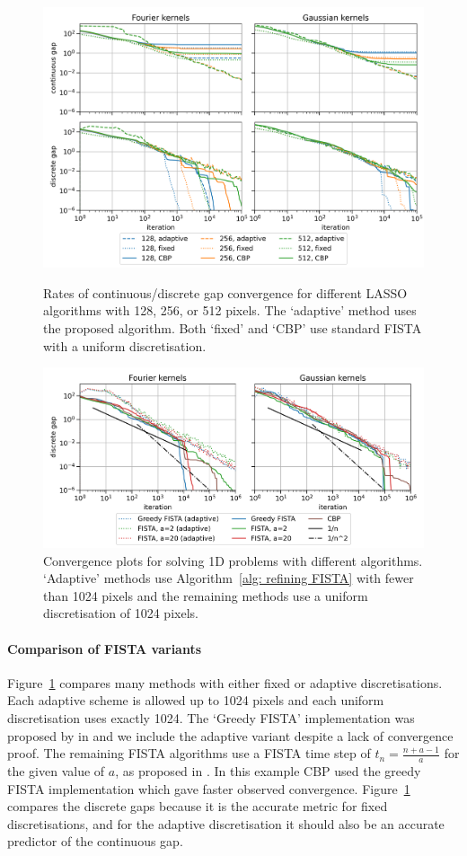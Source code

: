 \documentclass[smallextended]{svjour3}
\newcommand{\1}{\F{1}}
\newcommand{\edit}[2]{{\ifmmode\text{\color{red}\sout{\ensuremath{#1}}}\else {\color{red} \sout{#1}}\fi} {\color{darkgreen} #2}}
\begin{document}
	\begin{figure}\centering
		\includegraphics[width=.84\textwidth]{lasso_ndofs_convergence}
		\caption{Rates of continuous/discrete gap convergence for different LASSO algorithms with 128, 256, or 512 pixels. The `adaptive' method uses the proposed algorithm. Both `fixed' and `CBP' use standard FISTA with a uniform discretisation.}\label{fig: convergence with ndofs}
		
		\vspace*{\floatsep}
		
		\includegraphics[width=.84\textwidth]{lasso_convergence_short}
		\caption{\edit{Discrete }{}Convergence plots for solving 1D problems with different algorithms. `Adaptive' methods use Algorithm~\ref{alg: refining FISTA} with fewer than 1024 pixels and the remaining methods use a uniform discretisation of 1024 pixels.}\label{fig: convergence with method}
	\end{figure}
	
	
	\paragraph{Comparison of FISTA variants}
	Figure~\ref{fig: convergence with method} compares many methods with either fixed or adaptive discretisations. Each adaptive scheme is allowed up to 1024 pixels and each uniform discretisation uses exactly 1024. The `Greedy FISTA' implementation was proposed by in \cite{Liang2018} and we include the adaptive variant despite a lack of convergence proof. The remaining FISTA algorithms use a FISTA time step of $t_n = \frac{n+a-1}{a}$ for the given value of $a$, as proposed in \cite{Chambolle2015}. In this example CBP used the greedy FISTA implementation which gave faster observed convergence. Figure~\ref{fig: convergence with method} compares the discrete gaps because it is the accurate metric for fixed discretisations, and for the adaptive discretisation it should also be an accurate predictor of the continuous gap. 
	
\end{document}
